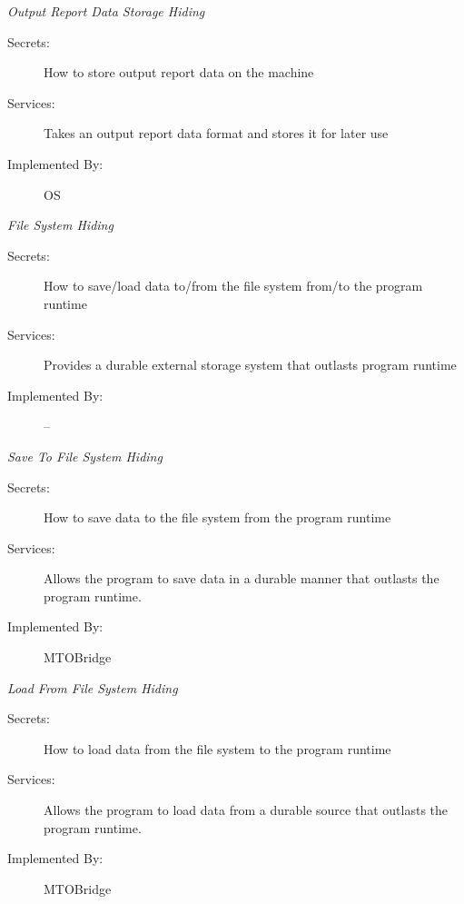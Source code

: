 \documentclass[12pt, titlepage]{article}
\begin{document}
    \emph{{\large Output Report Data Storage Hiding}}
    \begin{description}
        \item[Secrets:] How to store output report data on the machine
        \item[Services:]Takes an output report data format and stores it for later use
        \item[Implemented By:] OS\\
    \end{description}
    \emph{{\large File System Hiding}}
    \begin{description}
        \item[Secrets:]How to save/load data to/from the file system from/to the program runtime
        \item[Services:]Provides a durable external storage system that outlasts program runtime
        \item[Implemented By:] --\\
    \end{description}
    \emph{{\large Save To File System Hiding}}
    \begin{description}
        \item[Secrets:]How to save data to the file system from the program runtime
        \item[Services:] Allows the program to save data in a durable manner that outlasts the program runtime.
        \item[Implemented By:] MTOBridge\\
    \end{description}
    \emph{{\large Load From File System Hiding}}
    \begin{description}
        \item[Secrets:]How to load data from the file system to the program runtime
        \item[Services:]Allows the program to load data from a durable source that outlasts the program runtime.
        \item[Implemented By:] MTOBridge\\
    \end{description}
    
        
\end{document}
